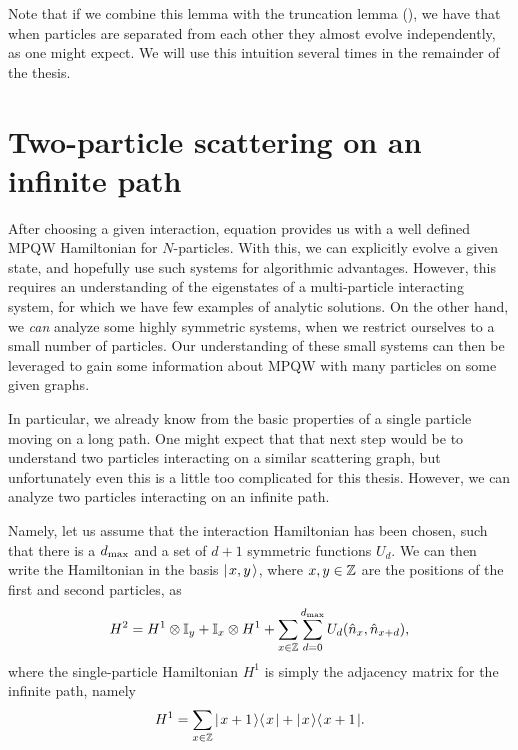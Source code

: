 \documentclass[../thesis-main/thesis-main]{subfiles}
\begin{document}
Note that if we combine this lemma with the truncation lemma (), we have that when particles are separated from each other they almost evolve independently, as one might expect.  We will use this intuition several times in the remainder of the thesis.


\section{Two-particle scattering on an infinite path}\label{sec:two_particle_scattering}

After choosing a given interaction, equation  provides us with a well defined MPQW Hamiltonian for $N$-particles.  With this, we can explicitly evolve a given state, and hopefully use such systems for algorithmic advantages.  However, this requires an understanding of the eigenstates of a multi-particle interacting system, for which we have few examples of analytic solutions.  On the other hand, we \emph{can} analyze some highly symmetric systems, when we restrict ourselves to a small number of particles.  Our understanding of these small systems can then be leveraged to gain some information about MPQW with many particles on some given graphs.

In particular, we already know from  the basic properties of a single particle moving on a long path.  One might expect that that next step would be to understand two particles interacting on a similar scattering graph, but unfortunately even this is a little too complicated for this thesis.  However, we can analyze two particles interacting on an infinite path.

Namely, let us assume that the interaction Hamiltonian has been chosen, such that there is a $d_{\text{max}}$ and a set of $d+1$ symmetric functions $U_d$.  We can then write the Hamiltonian  in the basis $|\mspace{2mu} x,y \mspace{2mu} \rangle$, where $x,y\in \mathbb{Z}$ are the positions of the first and second particles, as
\begin{align}
  H^{2} = H^1 \otimes \mathbb{I}_y + \mathbb{I}_x \otimes H^1 + \sum_{x\in \mathbb{Z}} \sum_{d=0}^{d_{\text{max}}} U_{d} (\hat{n}_x,\hat{n}_{x+d}) ,
  \label{eq:two_part_H_xy}
\end{align}
where the single-particle Hamiltonian $H^1$ is simply the adjacency matrix for the infinite path, namely
\begin{align}
  H^{1} = \sum_{x\in\mathbb{Z}} |\mspace{2mu} x+1 \mspace{2mu} \rangle\langle\mspace{2mu} x \mspace{2mu} | + |\mspace{2mu} x \mspace{2mu} \rangle\langle\mspace{2mu} x+1 \mspace{2mu} |.
\end{align}
\end{document}
